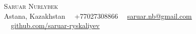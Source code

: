 \documentclass[letterpaper,10pt]{article}
\begin{document}


\begin{center}
    {\Huge \scshape Saruar Nurlybek} \\
    \vspace{5pt}
    \small Astana, Kazakhstan \ \textbar\ +77027308866 \ \textbar\ \href{mailto:saruar.nb@gmail.com}{\underline{saruar.nb@gmail.com}} \ \textbar\ \href{https://github.com/saruar-ryskaliyev/}{\underline{github.com/saruar-ryskaliyev}}
    \vspace{-8pt}
\end{center}



\end{document}

